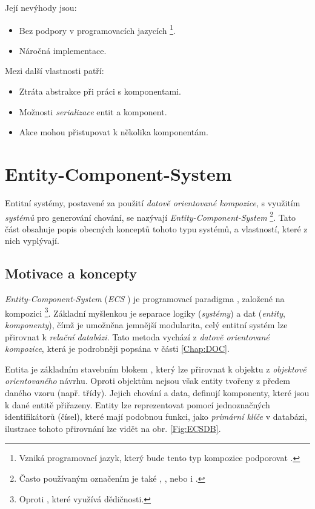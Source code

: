 \noindent Její nevýhody jsou: 
\begin{itemize}
	\item Bez podpory v programovacích jazycích \footnote{Vzniká programovací jazyk, který bude tento typ kompozice podporovat \cite{OOHLang}.}.
	\item Náročná implementace.
\end{itemize}

\pagebreak

\noindent Mezi další vlastnosti patří:
\begin{itemize}
	\item Ztráta abstrakce při práci s komponentami.
	\item Možnosti \emph{serializace} entit a komponent.
	\item Akce mohou přistupovat k několika komponentám.
\end{itemize}

\section{Entity-Component-System}
\label{Chap:EntitySystem} 

Entitní systémy, postavené za použití \emph{datově orientované kompozice}, s využitím \emph{systémů} pro generování chování, se nazývají \emph{Entity-Component-System}  \footnote{Často používaným označením je také ,  , nebo i .}. Tato část obsahuje popis obecných konceptů tohoto typu systémů, a vlastností, které z nich vyplývají.

\subsection{Motivace a koncepty}

\emph{Entity-Component-System} (\emph{ECS} \cite{WhatIsECS} \cite{UnderstandingECS}) je programovací paradigma \cite{EntitySystemsFuture}, založené na kompozici \footnote{Oproti , které využívá dědičnosti.}.  Základní myšlenkou je separace logiky (\emph{systémy}) a dat (\emph{entity}, \emph{komponenty}), čímž je umožněna jemnější modularita, celý entitní systém lze přirovnat k \emph{relační databázi}. Tato metoda vychází z \emph{datově orientované kompozice}, která je podrobněji popsána v části \ref{Chap:DOC}. 

Entita je základním stavebním blokem \cite{EntitySystemsFuture}, který lze přirovnat k objektu z \emph{objektově orientovaného} návrhu. Oproti objektům nejsou však entity tvořeny z předem daného vzoru (např. třídy). Jejich chování a data, definují komponenty, které jsou k dané entitě přiřazeny. Entity lze reprezentovat pomocí jednoznačných identifikátorů (čísel), které mají podobnou funkci, jako \emph{primární klíče} v databázi, ilustrace tohoto přirovnání lze vidět na obr. \ref{Fig:ECSDB}.

